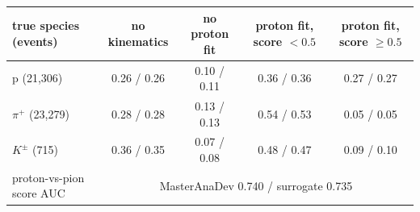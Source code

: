 \begin{tabular}{lcccc}
\toprule
true species (events) & no kinematics & no proton fit & proton fit, score $<0.5$ & proton fit, score $\geq 0.5$ \\
\midrule
p (21,306) & 0.26 / 0.26 & 0.10 / 0.11 & 0.36 / 0.36 & 0.27 / 0.27 \\
$\pi^+$ (23,279) & 0.28 / 0.28 & 0.13 / 0.13 & 0.54 / 0.53 & 0.05 / 0.05 \\
$K^\pm$ (715) & 0.36 / 0.35 & 0.07 / 0.08 & 0.48 / 0.47 & 0.09 / 0.10 \\
\midrule
proton-vs-pion score AUC & \multicolumn{4}{c}{MasterAnaDev 0.740 / surrogate 0.735} \\
\bottomrule
\end{tabular}
